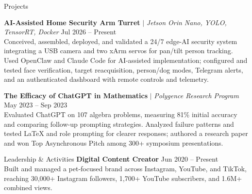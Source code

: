 \documentclass{resume}
\begin{document}
\begin{rSection}{Projects}
\vspace{-1.1em}
\item \textbf{AI-Assisted Home Security Arm Turret} $\mid$ \textit{Jetson Orin Nano, YOLO, TensorRT, Docker} \hfill Jul 2026 -- Present\\
Conceived, assembled, deployed, and validated a 24/7 edge-AI security system integrating a USB camera and two xArm servos for pan/tilt person tracking. Used OpenClaw and Claude Code for AI-assisted implementation; configured and tested face verification, target reacquisition, person/dog modes, Telegram alerts, and an authenticated dashboard with remote controls and telemetry.

\item \textbf{The Efficacy of ChatGPT in Mathematics} $\mid$ \textit{Polygence Research Program} \hfill May 2023 -- Sep 2023\\
Evaluated ChatGPT on 107 algebra problems, measuring 81\% initial accuracy and comparing follow-up prompting strategies. Analyzed failure patterns and tested LaTeX and role prompting for clearer responses; authored a research paper and won Top Asynchronous Pitch among 300+ symposium presentations.
\end{rSection}

\begin{rSection}{Leadership \& Activities}
\textbf{Digital Content Creator} \hfill Jun 2020 -- Present\\
Built and managed a pet-focused brand across Instagram, YouTube, and TikTok, reaching 30,000+ Instagram followers, 1,700+ YouTube subscribers, and 1.6M+ combined views.
\end{rSection}
\end{document}
